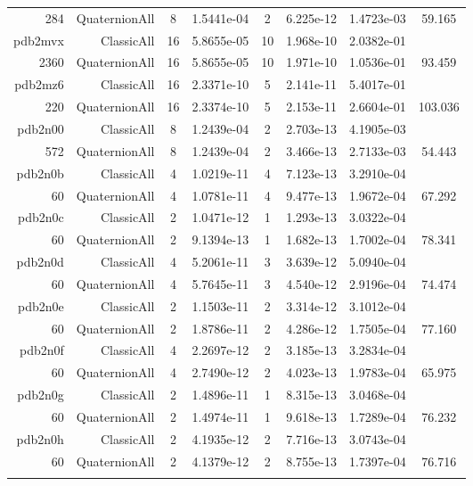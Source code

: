 \begin{xltabular}{\textwidth}{r|rcS[table-format=1.4e+2]cS[table-format=1.3e+2]S[table-format=1.4e+2]S[table-format=-1.3]}
284 & QuaternionAll & 8 & 1.5441e-04 & 2 & 6.225e-12 & 1.4723e-03 & 59.165\\  \addlinespace
pdb2mvx & ClassicAll & 16 & 5.8655e-05 & 10 & 1.968e-10 & 2.0382e-01 & \\
2360 & QuaternionAll & 16 & 5.8655e-05 & 10 & 1.971e-10 & 1.0536e-01 & 93.459\\  \addlinespace
pdb2mz6 & ClassicAll & 16 & 2.3371e-10 & 5 & 2.141e-11 & 5.4017e-01 & \\
220 & QuaternionAll & 16 & 2.3374e-10 & 5 & 2.153e-11 & 2.6604e-01 & 103.036\\  \addlinespace
pdb2n00 & ClassicAll & 8 & 1.2439e-04 & 2 & 2.703e-13 & 4.1905e-03 & \\
572 & QuaternionAll & 8 & 1.2439e-04 & 2 & 3.466e-13 & 2.7133e-03 & 54.443\\  \addlinespace
pdb2n0b & ClassicAll & 4 & 1.0219e-11 & 4 & 7.123e-13 & 3.2910e-04 & \\
60 & QuaternionAll & 4 & 1.0781e-11 & 4 & 9.477e-13 & 1.9672e-04 & 67.292\\  \addlinespace
pdb2n0c & ClassicAll & 2 & 1.0471e-12 & 1 & 1.293e-13 & 3.0322e-04 & \\
60 & QuaternionAll & 2 & 9.1394e-13 & 1 & 1.682e-13 & 1.7002e-04 & 78.341\\  \addlinespace
pdb2n0d & ClassicAll & 4 & 5.2061e-11 & 3 & 3.639e-12 & 5.0940e-04 & \\
60 & QuaternionAll & 4 & 5.7645e-11 & 3 & 4.540e-12 & 2.9196e-04 & 74.474\\  \addlinespace
pdb2n0e & ClassicAll & 2 & 1.1503e-11 & 2 & 3.314e-12 & 3.1012e-04 & \\
60 & QuaternionAll & 2 & 1.8786e-11 & 2 & 4.286e-12 & 1.7505e-04 & 77.160\\  \addlinespace
pdb2n0f & ClassicAll & 4 & 2.2697e-12 & 2 & 3.185e-13 & 3.2834e-04 & \\
60 & QuaternionAll & 4 & 2.7490e-12 & 2 & 4.023e-13 & 1.9783e-04 & 65.975\\  \addlinespace
pdb2n0g & ClassicAll & 2 & 1.4896e-11 & 1 & 8.315e-13 & 3.0468e-04 & \\
60 & QuaternionAll & 2 & 1.4974e-11 & 1 & 9.618e-13 & 1.7289e-04 & 76.232\\  \addlinespace
pdb2n0h & ClassicAll & 2 & 4.1935e-12 & 2 & 7.716e-13 & 3.0743e-04 & \\
60 & QuaternionAll & 2 & 4.1379e-12 & 2 & 8.755e-13 & 1.7397e-04 & 76.716\\  \addlinespace

\end{xltabular}
